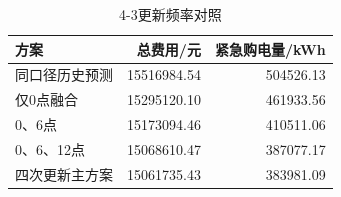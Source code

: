 \begin{table}[htbp]\centering\small
\caption{4-3更新频率对照}
\begin{tabular}{lrr}\toprule
方案 & 总费用/元 & 紧急购电量/kWh\\\midrule
同口径历史预测 & 15516984.54 & 504526.13\\
仅0点融合 & 15295120.10 & 461933.56\\
0、6点 & 15173094.46 & 410511.06\\
0、6、12点 & 15068610.47 & 387077.17\\
四次更新主方案 & 15061735.43 & 383981.09\\
\bottomrule\end{tabular}\end{table}
